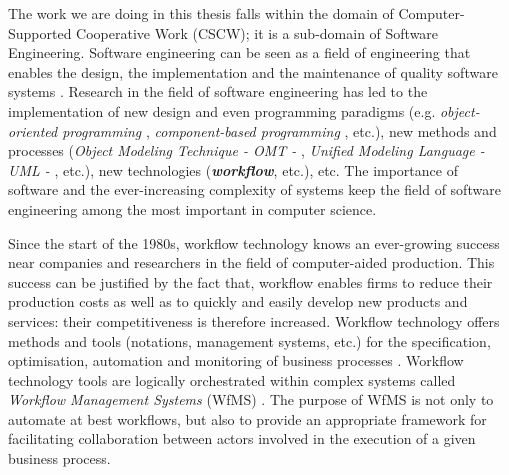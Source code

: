 \label{chap1:sec:introduction}
The work we are doing in this thesis falls within the domain of Computer-Supported Cooperative Work (CSCW); it is a sub-domain of Software Engineering. Software engineering can be seen as a field of engineering that enables the design, the implementation and the maintenance of quality software systems \cite{barais2005construire}. 
Research in the field of software engineering has led to the implementation of new design and even programming paradigms (e.g. \textit{object-oriented programming} \cite{meyer2000conception}, \textit{component-based programming} \cite{heineman2001component}, etc.), new methods and processes (\textit{Object Modeling Technique - OMT -} \cite{rumbaugh1991object}, \textit{Unified Modeling Language - UML -} \cite{booch2000guide}, etc.), new technologies (\textit{\textbf{workflow}}, etc.), etc. The importance of software and the ever-increasing complexity of systems keep the field of software engineering among the most important in computer science.

Since the start of the 1980s, workflow technology knows an ever-growing success near companies and researchers in the field of computer-aided production. 
This success can be justified by the fact that, workflow enables firms to reduce their production costs as well as to quickly and easily develop new products and services: their competitiveness is therefore increased. 
Workflow technology offers methods and tools (notations, management systems, etc.) for the specification, optimisation, automation and monitoring of business processes \cite{workflow95, van2015business}.   
Workflow technology tools are logically orchestrated within complex systems called \textit{Workflow Management Systems} (WfMS) \cite{workflowModel, ima}. 
The purpose of WfMS is not only to automate at best workflows, but also to provide an appropriate framework for facilitating collaboration between actors involved in the execution of a given business process. 

